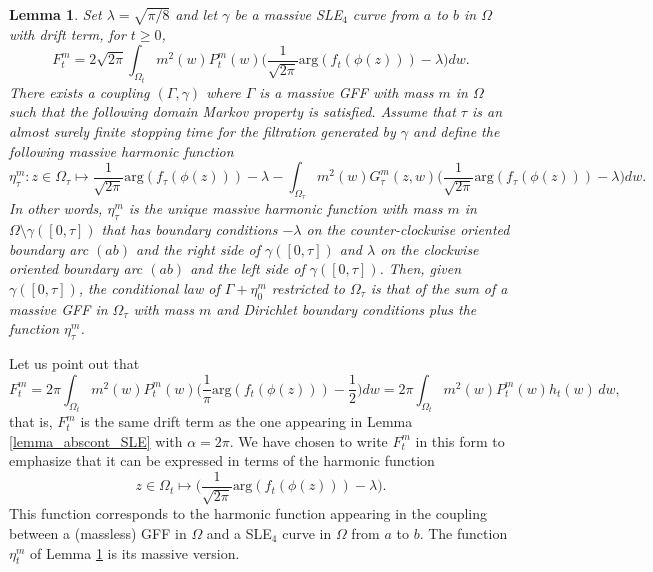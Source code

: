 \documentclass{article}
\newtheorem{lemma}[theorem]{Lemma}
\theoremstyle{definition}
\theoremstyle{remark}
\theoremstyle{remark}
\begin{document}
\begin{lemma} \label{lemma_coupling}
    Set $\lambda=\sqrt{\pi/8}$ and let $\gamma$ be a massive SLE$_4$ curve from $a$ to $b$ in $\Omega$ with drift term, for $t \geq 0$,
    \begin{equation*}
        F_t^m = 2\sqrt{2\pi} \int_{\Omega_t} m^2(w) P_t^m(w) \bigg(\frac{1}{\sqrt{2\pi}}\text{arg}(f_t(\phi(z)))-\lambda \bigg) dw.
    \end{equation*} 
    There exists a coupling $(\Gamma, \gamma)$ where $\Gamma$ is a massive GFF with mass $m$ in $\Omega$ such that the following domain Markov property is satisfied. Assume that $\tau$ is an almost surely finite stopping time for the filtration generated by $\gamma$ and define the following massive harmonic function 
    \begin{equation*}
        \eta_{\tau}^m : z \in \Omega_{\tau} \mapsto  \frac{1}{\sqrt{2\pi}} \text{arg}(f_{\tau}(\phi(z))) - \lambda - \int_{\Omega_{\tau}} m^2(w) G_{\tau}^m(z,w) \bigg(\frac{1}{\sqrt{2\pi}} \text{arg}(f_{\tau}(\phi(z))) - \lambda \bigg) dw.
    \end{equation*}
    In other words, $\eta_{\tau}^m$ is the unique massive harmonic function with mass $m$ in $\Omega \setminus \gamma([0,\tau])$ that has boundary conditions $-\lambda$ on the counter-clockwise oriented boundary arc $(ab)$ and the right side of $\gamma([0,\tau])$ and $\lambda$ on the clockwise oriented boundary arc $(ab)$ and the left side of $\gamma([0,\tau])$. Then, given $\gamma([0,\tau])$, the conditional law of $\Gamma+\eta_0^m$ restricted to $\Omega_{\tau}$ is that of the sum of a massive GFF in $\Omega_{\tau}$ with mass $m$ and Dirichlet boundary conditions plus the function $\eta_{\tau}^m$.
\end{lemma}

Let us point out that
 \begin{equation*}
        F_t^m = 2\pi \int_{\Omega_t} m^2(w) P_t^m(w) \bigg(\frac{1}{\pi}\text{arg}(f_t(\phi(z)))-\frac12\bigg) dw=2\pi \int_{\Omega_t} m^2(w) P_t^m(w) h_t(w) \, dw,
\end{equation*} 
that is, $F_t^m$ is the same drift term as the one appearing in Lemma \ref{lemma_abscont_SLE} with $\alpha=2\pi$. We have chosen to write $F_t^m$ in this form to emphasize that it can be expressed in terms of the harmonic function
\begin{equation*}
    z \in \Omega_t \mapsto \bigg(\frac{1}{\sqrt{2\pi}}\text{arg}(f_t(\phi(z)))-\lambda \bigg).
\end{equation*}
This function corresponds to the harmonic function appearing in the coupling between a (massless) GFF in $\Omega$ and a SLE$_4$ curve in $\Omega$ from $a$ to $b$. The function $\eta_t^m$ of Lemma \ref{lemma_coupling} is its massive version.
\end{document}
